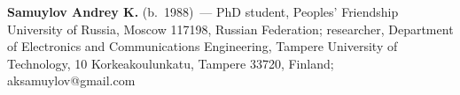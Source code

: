 \vspace*{3pt}

\noindent
\textbf{Samuylov Andrey K.} (b.\ 1988)~---
PhD student, Peoples' Friendship University of Russia, Moscow 117198, Russian
Federation; researcher, Department of Electronics and Communications Engineering,  Tampere
University of Technology, 10 Korkeakoulunkatu, Tampere 33720, Finland;
aksamuylov@gmail.com

\label{end\stat}

\renewcommand{\bibname}{\protect\rm Литература}
